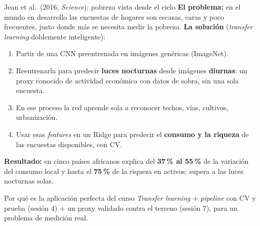 \documentclass{beamer}
\newcommand{\1}{\mathbb{I}}
\begin{document}
\begin{frame}{Jean et al.\ (2016, \emph{Science}): pobreza vista desde el cielo}
\small
\textbf{El problema:} en el mundo en desarrollo las encuestas de hogares son escasas, caras y poco frecuentes, justo donde más se necesita medir la pobreza.
\pause
\textbf{La solución} (\emph{transfer learning} doblemente inteligente):
\begin{enumerate}\itemsep1pt
  \item Partir de una CNN preentrenada en imágenes genéricas (ImageNet).
  \item Reentrenarla para predecir \textbf{luces nocturnas} desde imágenes \textbf{diurnas}: un proxy conocido de actividad económica con datos de sobra, sin una sola encuesta.
  \item En ese proceso la red aprende sola a reconocer techos, vías, cultivos, urbanización.
  \item Usar esas \emph{features} en un Ridge para predecir el \textbf{consumo y la riqueza} de las encuestas disponibles, con CV.
\end{enumerate}
\pause
\textbf{Resultado:} en cinco países africanos explica del \textbf{37\,\% al 55\,\%} de la variación del consumo local y hasta el \textbf{75\,\%} de la riqueza en activos; supera a las luces nocturnas solas.
\pause
\begin{block}{Por qué es la aplicación perfecta del curso}
\emph{Transfer learning} $+$ \emph{pipeline} con CV y prueba (sesión 4) $+$ un proxy validado contra el terreno (sesión 7), para un problema de medición real.
\end{block}
\end{frame}
\end{document}
